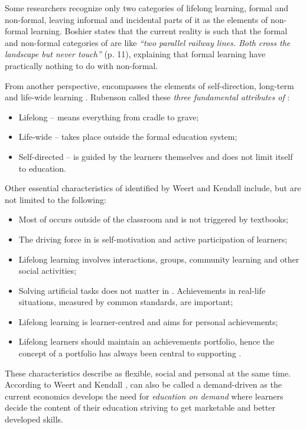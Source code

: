 Some researchers \citep{Longworth2003} recognize only two categories of lifelong
learning, formal and non-formal, leaving informal and incidental parts of it as
the elements of non-formal learning. Boshier \citeyearpar{Boshier2000} states
that the current reality is such that the formal and non-formal categories of
\LLLs are like \textit{``two parallel railway lines. Both cross the landscape but
never touch''} (p. 11), explaining that formal learning have practically nothing
to do with non-formal.

From another perspective, \LLLs encompasses the elements of self-direction,
long-term and life-wide learning \citep{Schuetze2006}. Rubenson
\citeyearpar{Rubenson2002} called these \textit{three fundamental attributes of
\LLLs}:

\begin{itemize}
  \item Lifelong -- means everything from cradle to grave;
  \item Life-wide -- takes place outside the formal education system;
  \item Self-directed -- is guided by the learners themselves and does not
  limit itself to education.
\end{itemize} 

Other essential characteristics of \LLLs identified by Weert and Kendall
\citeyearpar{Kendall2004} include, but are not limited to the following:

\begin{itemize}
  \item Most of \LLLs occurs outside of the classroom and is not triggered by
  textbooks;
  \item The driving force in \LLLs is self-motivation and active participation
  of learners;
  \item Lifelong learning involves interactions, groups, community learning and
  other social activities;
  \item Solving artificial tasks does not matter in \LLLsn. Achievements in
  real-life situations, measured by common standards, are important;
  \item Lifelong learning is learner-centred and aims for personal
  achievements;
  \item Lifelong learners should maintain an achievements portfolio, hence the
  concept of a portfolio has always been central to supporting \LLLsn.
\end{itemize} 

These characteristics describe \LLLs as flexible, social and personal at the
same time. According to Weert and Kendall \citeyearpar{Kendall2004}, \LLLs can
also be called a demand-driven as the current economics develops the need for
\textit{education on demand} where learners decide the content of their
education striving to get marketable and better developed skills.


